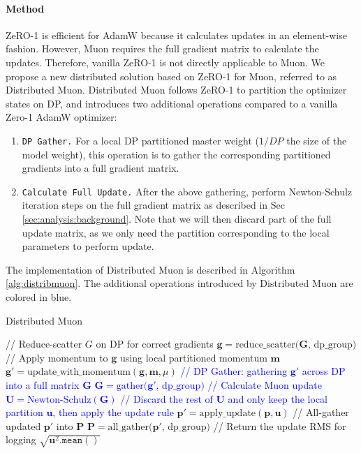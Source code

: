 \paragraph{Method}
ZeRO-1 is efficient for AdamW because it calculates updates in an element-wise fashion. However, Muon requires the full gradient matrix to calculate the updates. Therefore, vanilla ZeRO-1 is not directly applicable to Muon. We propose a new distributed solution based on ZeRO-1 for Muon, referred to as Distributed Muon. Distributed Muon follows ZeRO-1 to partition the optimizer states on DP, and introduces two additional operations compared to a vanilla Zero-1 AdamW optimizer:

\begin{enumerate}
    \item \texttt{DP Gather.} For a local DP partitioned master weight ($1/DP$ the size of the model weight), this operation is to gather the corresponding partitioned gradients into a full gradient matrix. 
    
    \item \texttt{Calculate Full Update.} After the above gathering, perform Newton-Schulz iteration steps on the full gradient matrix as described in Sec \ref{sec:analysis:background}. Note that we will then discard part of the full update matrix, as we only need the partition corresponding to the local parameters to perform update.
\end{enumerate}


The implementation of Distributed Muon is described in Algorithm \ref{alg:distribmuon}. The additional operations introduced by Distributed Muon are colored in blue.

\begin{algorithm}[t]
\caption{Distributed Muon}
\label{alg:distribmuon}
\begin{algorithmic}[1]
\STATE // Reduce-scatter $G$ on DP for correct gradients
\STATE $\mathbf{g} = \text{reduce\_scatter($\mathbf{G}$, dp\_group)}$ 
\STATE // Apply momentum to $\mathbf{g}$   using local partitioned momentum $\mathbf{m}$
\STATE $\mathbf{g}' = \text{update\_with\_momentum}(\mathbf{g}, \mathbf{m}, \mu)$
\STATE \textcolor{blue}{// DP Gather: gathering $\mathbf{g'}$ across DP into a full matrix $\mathbf{G}$}
\STATE \textcolor{blue}{$\mathbf{G} = \text{gather($\mathbf{g'}$, dp\_group)}$}
\STATE \textcolor{blue}{// Calculate Muon update}
\STATE \textcolor{blue}{$\mathbf{U} = \text{Newton-Schulz}(\mathbf{G})$ }
\STATE \textcolor{blue}{// Discard the rest of $\mathbf{U}$ and only keep the local partition  ${\mathbf{u}}$, then apply the update rule}
\STATE $\mathbf{p}' = \text{apply\_update}(\mathbf{p}, \mathbf{u})$
\STATE // All-gather updated $\mathbf{p'}$ into $\mathbf{P}$ 
\STATE $\mathbf{P} = \text{all\_gather($\mathbf{p'}$, dp\_group)}$
\STATE // Return the update RMS for logging
\RETURN $\sqrt{\mathbf{u}^2.\texttt{mean}()}$ 
\end{algorithmic}
\end{algorithm}


